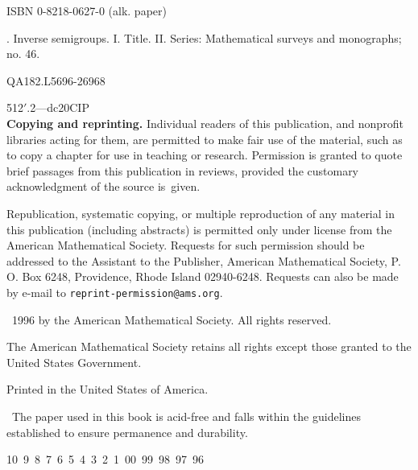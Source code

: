 \documentclass{surv-l}
\begin{document}
\begin{copyrightpage}
\quad ISBN 0-8218-0627-0 (alk. paper)

. Inverse semigroups. I. Title. II. Series: Mathematical
surveys and monographs; no. 46.

QA182.L56\hfill 96-26968

512$'$.2---dc20\hfill CIP\\

\textbf{Copying and reprinting.} Individual readers of this
publication, and nonprofit libraries acting for them, are
permitted to make fair use of the material, such as to copy a
chapter for use in teaching or research. Permission is granted to
quote brief passages from this publication in reviews, provided
the customary acknowledgment of the source is~given.

Republication, systematic copying, or multiple reproduction of any
material in this publication (including abstracts) is permitted
only under license from the American Mathematical Society.
Requests for such permission should be addressed to the Assistant
to the Publisher, American Mathematical Society, P. O. Box 6248,
Providence, Rhode Island 02940-6248. Requests can also be made by
e-mail to \texttt{reprint-permission@ams.org}.

\begin{center}
\textcopyright\ 1996 by the American Mathematical Society. All rights reserved.

The American Mathematical Society retains all rights except those granted to the United States Government.

Printed in the United States of America.

\circledinfty\ The paper used in this book is acid-free and falls within the guidelines established to ensure permanence and durability.

10\ 9\ 8\ 7\ 6\ 5\ 4\ 3\ 2\ 1\ 00\ 99\ 98\ 97\ 96
\end{center}
\end{copyrightpage}
\end{document}
